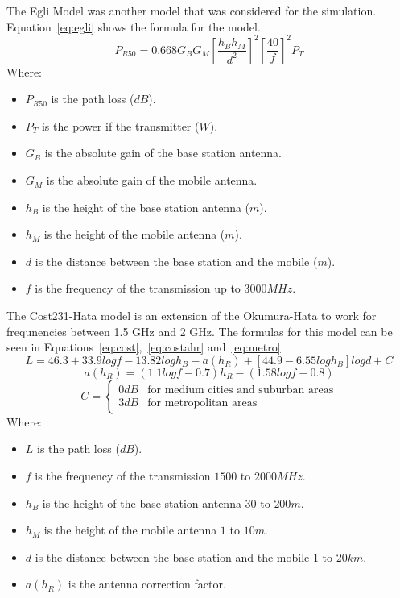 The Egli Model was another model that was considered for the simulation. Equation~\ref{eq:egli} shows the formula for the model.
\begin{equation}\label{eq:egli}
P_{R50}=0.668G_{B}G_{M}[\frac{h_{B}h_{M}}{d^{2}}]^{2}[\frac{40}{f}]^{2}P_{T}
\end{equation}
Where:
\begin{itemize}
\item $P_{R50}$ is the path loss ($dB$).
\item $P_{T}$ is the power if the transmitter ($W$).
\item $G_{B}$ is the absolute gain of the base station antenna.
\item $G_{M}$ is the absolute gain of the mobile antenna.
\item $h_{B}$ is the height of the base station antenna ($m$).
\item $h_{M}$ is the height of the mobile antenna ($m$).
\item $d$ is the distance between the base station and the mobile ($m$).
\item $f$ is the frequency of the transmission up to $3000 MHz$.
\end{itemize}

The Cost231-Hata model is an extension of the Okumura-Hata to work for frequnencies between 1.5 GHz and 2 GHz. The formulas for this model can be seen in Equations~\ref{eq:cost},~\ref{eq:costahr} and~\ref{eq:metro}.
\begin{equation}\label{eq:cost}
L=46.3+33.9logf-13.82log{h_{B}}-a(h_{R})+[44.9-6.55log{h_{B}}]log{d}+C
\end{equation}
\begin{equation}\label{eq:costahr}
a(h_{R})=(1.1log{f}-0.7)h_{R}-(1.58log{f}-0.8)
\end{equation}
\begin{equation}\label{eq:metro}
C=
	\begin{cases}
	0 dB & \mbox{for medium cities and suburban areas} \\
	3 dB & \mbox{for metropolitan areas}
	\end{cases}
\end{equation}
Where:
\begin{itemize}
\item $L$ is the path loss ($dB$).
\item $f$ is the frequency of the transmission $1500$ to $2000 MHz$.
\item $h_{B}$ is the height of the base station antenna $30$ to $200 m$.
\item $h_{M}$ is the height of the mobile antenna $1$ to $10 m$.
\item $d$ is the distance between the base station and the mobile $1$ to $20 km$.
\item $a(h_{R})$ is the antenna correction factor.
\end{itemize}

